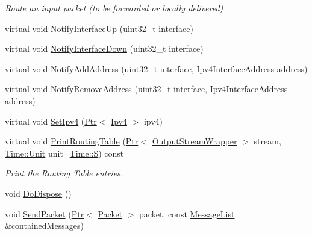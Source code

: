 \begin{DoxyCompactItemize}
\begin{DoxyCompactList}\small\item\em Route an input packet (to be forwarded or locally delivered) \end{DoxyCompactList}\item 
virtual void \hyperlink{classns3_1_1olsr_1_1RoutingProtocol_a389d83b05f1110042dfb4fc77666c5d3}{Notify\+Interface\+Up} (uint32\+\_\+t interface)
\item 
virtual void \hyperlink{classns3_1_1olsr_1_1RoutingProtocol_a8fc8faa57ffe549d56b5db197dcd17e4}{Notify\+Interface\+Down} (uint32\+\_\+t interface)
\item 
virtual void \hyperlink{classns3_1_1olsr_1_1RoutingProtocol_a054b550049839fe54a67e73c4d492a21}{Notify\+Add\+Address} (uint32\+\_\+t interface, \hyperlink{classns3_1_1Ipv4InterfaceAddress}{Ipv4\+Interface\+Address} address)
\item 
virtual void \hyperlink{classns3_1_1olsr_1_1RoutingProtocol_ab21c8e08be88e0e03d9327731a3b52da}{Notify\+Remove\+Address} (uint32\+\_\+t interface, \hyperlink{classns3_1_1Ipv4InterfaceAddress}{Ipv4\+Interface\+Address} address)
\item 
virtual void \hyperlink{classns3_1_1olsr_1_1RoutingProtocol_ab0e32a7ea7f5198133eaacca3b4c12da}{Set\+Ipv4} (\hyperlink{classns3_1_1Ptr}{Ptr}$<$ \hyperlink{classns3_1_1Ipv4}{Ipv4} $>$ ipv4)
\item 
virtual void \hyperlink{classns3_1_1olsr_1_1RoutingProtocol_a8b7d440d2ff617159fbf48c93e2ca895}{Print\+Routing\+Table} (\hyperlink{classns3_1_1Ptr}{Ptr}$<$ \hyperlink{classns3_1_1OutputStreamWrapper}{Output\+Stream\+Wrapper} $>$ stream, \hyperlink{classns3_1_1Time_a87a7f4d29c68b047a72d291ad660295a}{Time\+::\+Unit} unit=\hyperlink{classns3_1_1Time_a87a7f4d29c68b047a72d291ad660295aade8622b06524a328cd3a59db6ccf76af}{Time\+::S}) const 
\begin{DoxyCompactList}\small\item\em Print the Routing Table entries. \end{DoxyCompactList}\item 
void \hyperlink{classns3_1_1olsr_1_1RoutingProtocol_a4f4847a879139dc41e184b8233573143}{Do\+Dispose} ()
\item 
void \hyperlink{classns3_1_1olsr_1_1RoutingProtocol_a31a103b24f235d7a7719258993363fc9}{Send\+Packet} (\hyperlink{classns3_1_1Ptr}{Ptr}$<$ \hyperlink{classns3_1_1Packet}{Packet} $>$ packet, const \hyperlink{namespacens3_1_1olsr_af17c710718a5637d01f37804a0a53e78}{Message\+List} \&contained\+Messages)
\item 

\end{DoxyCompactItemize}
